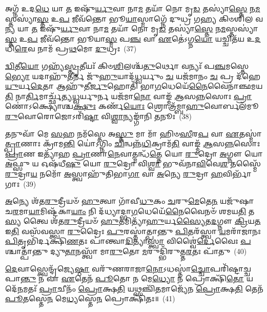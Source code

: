 {\anuvakamend[{\-\ul{𑌶𑍍𑌯𑍈}\-\-\ul{𑌤}\-𑌤𑍍𑌵𑌂 \ul{𑌪𑍍𑌰}\-𑌤𑍀𑌚𑍍𑌯𑌾॑ 𑌤𑍍𑌵𑌾 \ul{𑌦𑌿}\-𑌶𑌾 𑌸𑌾᳴𑌦𑌯𑌾\-\ul{𑌮𑌿} 𑌯𑌃 𑌸𑌾𑌤𑍍𑌮𑌾᳴𑌨𑌞𑍍𑌚𑌿\-\ul{𑌨𑍁}\-𑌤𑍇 𑌦𑍍𑌵𑌾𑌵𑌿𑍞᳴𑌶𑌤𑌿𑌶𑍍𑌚}]}%

𑌅𑌗𑍍𑌨᳴ 𑌉𑌦\-\ul{𑌧𑍇} 𑌯𑌾 \ul{𑌤} 𑌇𑌷𑍁᳴\-\ul{𑌰𑍍𑌯𑍁}\-𑌵𑌾 𑌨𑌾\-\ul{𑌮} 𑌤𑌯𑌾᳴ 𑌨𑍋 𑌮𑍃\-\ul{𑌡} 𑌤𑌸𑍍𑌯𑌾॑\-\ul{𑌸𑍍𑌤𑍇} 𑌨\-\ul{𑌮}\-𑌸𑍍𑌤𑌸𑍍𑌯𑌾॑\-\ul{𑌸𑍍𑌤} 𑌉\-\ul{𑌪} 𑌜𑍀𑌵᳴𑌨𑍍𑌤𑍋 𑌭𑍂\-\ul{𑌯𑌾}\-𑌸𑍍𑌮𑌾𑌗𑍍𑌨𑍇᳴ 𑌦𑍁𑌧𑍍𑌰 𑌗𑌹𑍍𑌯 𑌕𑌿𑍞𑌶𑌿𑌲 𑌵\-\ul{𑌨𑍍𑌯} 𑌯𑌾 \ul{𑌤} 𑌇𑌷𑍁᳴\-\ul{𑌰𑍍𑌯𑍁}\-𑌵𑌾 𑌨𑌾\-\ul{𑌮} 𑌤𑌯𑌾᳴ 𑌨𑍋 𑌮𑍃\-\ul{𑌡} 𑌤𑌸𑍍𑌯𑌾॑\-\ul{𑌸𑍍𑌤𑍇} 𑌨\-\ul{𑌮}\-𑌸𑍍𑌤𑌸𑍍𑌯𑌾॑\-\ul{𑌸𑍍𑌤} 𑌉\-\ul{𑌪} 𑌜𑍀𑌵᳴𑌨𑍍𑌤𑍋 𑌭𑍂𑌯𑌾\-\ul{𑌸𑍍𑌮} 𑌪\-\ul{𑌞𑍍𑌚} 𑌵𑌾 \ul{𑌏}\-𑌤𑍇॑\-𑌽𑌗𑍍𑌨\-\ul{𑌯𑍋} 𑌯𑌚𑍍𑌚𑌿𑌤᳴𑌯 𑌉\-\ul{𑌦}\-𑌧𑌿\-\ul{𑌰𑍇}\-𑌵 𑌨𑌾𑌮᳴ 𑌪𑍍𑌰\-\ul{𑌥}\-𑌮𑍋 \ul{𑌦𑍁}\-𑌧𑍍𑌰𑌃~(37)

\-\ul{𑌦𑍍𑌵𑌿}\-𑌤𑍀\-\ul{𑌯𑍋} 𑌗𑌹𑍍𑌯᳴\-\ul{𑌸𑍍𑌤𑍃}\-𑌤𑍀𑌯𑌃᳴ 𑌕𑌿𑍞\-\ul{𑌶𑌿}\-𑌲𑌶𑍍𑌚᳴\-\ul{𑌤𑍁}\-𑌰𑍍𑌥𑍋 𑌵𑌨𑍍𑌯𑌃᳴ 𑌪\-\ul{𑌞𑍍𑌚}\-𑌮𑌸𑍍𑌤𑍇\-\ul{𑌭𑍍𑌯𑍋} 𑌯𑌦𑌾𑌹𑍁᳴\-\ul{𑌤𑍀}\-𑌰𑍍𑌨 𑌜𑍁᳴\-\ul{𑌹𑍁}\-𑌯𑌾𑌦᳴\-\ul{𑌧𑍍𑌵}\-𑌰𑍍𑌯𑍁𑌂 \ul{𑌚} 𑌯𑌜᳴𑌮𑌾𑌨𑌂 \ul{𑌚} 𑌪𑍍𑌰 𑌦᳴𑌹𑍇\-\ul{𑌯𑍁}\-𑌰𑍍𑌯\-\ul{𑌦𑍇}\-𑌤𑌾 𑌆𑌹𑍁᳴𑌤𑍀\-\ul{𑌰𑍍𑌜𑍁}\-𑌹𑍋𑌤𑌿᳴ 𑌭𑌾\-\ul{𑌗}\-𑌧𑍇𑌯𑍇᳴\-\ul{𑌨𑍈}\-𑌵𑍈𑌨𑌾॑𑌞𑍍𑌛𑌮𑌯\-\ul{𑌤𑌿} 𑌨𑌾\-\ul{𑌰𑍍𑌤𑌿}\-𑌮𑌾𑌰𑍍𑌚𑍍𑌛᳴𑌤𑍍𑌯\-\ul{𑌧𑍍𑌵}\-𑌰𑍍𑌯𑍁𑌰𑍍𑌨 𑌯𑌜᳴𑌮𑌾\-\ul{𑌨𑍋} 𑌵𑌾𑌙𑍍𑌮᳴ \ul{𑌆}\-𑌸\-\ul{𑌨𑍍𑌨}\-𑌸𑍋𑌃 \ul{𑌪𑍍𑌰𑌾}\-𑌣𑍋॑\-𑌽𑌕𑍍𑌷𑍍𑌯𑍋𑌶𑍍𑌚\-\ul{𑌕𑍍𑌷𑍁𑌃} 𑌕𑌰𑍍𑌣᳴\-\ul{𑌯𑍋𑌃} 𑌶𑍍𑌰𑍋𑌤𑍍𑌰᳴𑌮𑍍𑌬𑌾\-\ul{𑌹𑍁}\-𑌵𑍋𑌰𑍍𑌬𑌲᳴𑌮𑍂\-\ul{𑌰𑍁}\-𑌵𑍋𑌰𑍋𑌜𑍋\-𑌽𑌰𑌿᳴\-\ul{𑌷𑍍𑌟𑌾} 𑌵𑌿\-\ul{𑌶𑍍𑌵𑌾}\-𑌨𑍍𑌯𑌙𑍍𑌗𑌾᳴𑌨𑌿 \ul{𑌤}\-𑌨𑍂𑌃~(38)

\-\ul{𑌤}\-𑌨𑍁𑌵𑌾᳴ 𑌮𑍇 \ul{𑌸}\-𑌹 𑌨𑌮᳴𑌸𑍍𑌤𑍇 𑌅\-\ul{𑌸𑍍𑌤𑍁} 𑌮𑌾 𑌮𑌾᳴ 𑌹𑌿𑍞\-\ul{𑌸𑍀}\-𑌰\-\ul{𑌪} 𑌵𑌾 \ul{𑌏}\-𑌤𑌸𑍍𑌮𑌾॑\-\ul{𑌤𑍍𑌪𑍍𑌰𑌾}\-𑌣𑌾𑌃 𑌕𑍍𑌰𑌾᳴𑌮\-\ul{𑌨𑍍𑌤𑌿} 𑌯𑍋॑\-𑌽𑌗𑍍𑌨𑌿𑌂 \ul{𑌚𑌿}\-𑌨𑍍𑌵𑌨𑍍𑌨᳴\-\ul{𑌧𑌿}\-𑌕𑍍𑌰𑌾𑌮᳴\-\ul{𑌤𑌿} 𑌵𑌾𑌙𑍍𑌮᳴ \ul{𑌆}\-𑌸\-\ul{𑌨𑍍𑌨}\-𑌸𑍋𑌃 \ul{𑌪𑍍𑌰𑌾}\-𑌣 𑌇𑌤𑍍𑌯𑌾᳴𑌹 \ul{𑌪𑍍𑌰𑌾}\-𑌣𑌾\-\ul{𑌨𑍇}\-𑌵𑌾𑌤𑍍𑌮𑌨𑍍𑌧᳴\-\ul{𑌤𑍍𑌤𑍇} 𑌯𑍋 \ul{𑌰𑍁}\-𑌦𑍍𑌰𑍋 \ul{𑌅}\-𑌗𑍍𑌨𑍗 𑌯𑍋 \ul{𑌅}\-𑌫𑍍𑌸𑍁 𑌯 𑌓𑌷᳴𑌧𑍀\-\ul{𑌷𑍁} 𑌯𑍋 \ul{𑌰𑍁}\-𑌦𑍍𑌰𑍋 𑌵𑌿\-\ul{𑌶𑍍𑌵𑌾} 𑌭𑍁𑌵᳴𑌨𑌾\-\ul{𑌵𑌿}\-𑌵𑍇\-\ul{𑌶} 𑌤𑌸𑍍𑌮𑍈᳴ \ul{𑌰𑍁}\-𑌦𑍍𑌰𑌾\-\ul{𑌯} 𑌨𑌮𑍋᳴ \ul{𑌅}\-𑌸𑍍𑌤𑍍𑌵𑌾𑌹𑍁᳴𑌤𑌿𑌭𑌾\-\ul{𑌗𑌾} 𑌵𑌾 \ul{𑌅}\-𑌨𑍍𑌯𑍇 \ul{𑌰𑍁}\-𑌦𑍍𑌰𑌾 \ul{𑌹}\-𑌵𑌿𑌰𑍍𑌭𑌾᳴𑌗𑌾𑌃~(39)

\-\ul{𑌅}\-𑌨𑍍𑌯𑍇 𑌶᳴𑌤\-\ul{𑌰𑍁}\-𑌦𑍍𑌰𑍀𑌯𑍞᳴ \ul{𑌹𑍁}\-𑌤𑍍𑌵𑌾 𑌗𑌾᳴𑌵𑍀\-\ul{𑌧𑍁}\-𑌕𑌂 \ul{𑌚}\-𑌰𑍁\-\ul{𑌮𑍇}\-𑌤𑍇\-\ul{𑌨} 𑌯𑌜𑍁᳴𑌷𑌾 𑌚\-\ul{𑌰}\-𑌮𑌾\-\ul{𑌯𑌾}\-𑌮𑌿𑌷𑍍𑌟᳴𑌕𑌾\-\ul{𑌯𑌾𑌂} 𑌨𑌿 𑌦᳴𑌧𑍍𑌯𑌾𑌦𑍍𑌭𑌾\-\ul{𑌗}\-𑌧𑍇𑌯𑍇᳴\-\ul{𑌨𑍈}\-𑌵𑍈𑌨𑍞᳴ 𑌶𑌮𑌯\-\ul{𑌤𑌿} 𑌤\-\ul{𑌸𑍍𑌯} 𑌤𑍍𑌵𑍈 𑌶᳴𑌤\-\ul{𑌰𑍁}\-𑌦𑍍𑌰𑍀𑌯𑍞᳴ \ul{𑌹𑍁}\-𑌤𑌮𑌿𑌤𑍍𑌯𑌾᳴\-\ul{𑌹𑍁}\-𑌰𑍍𑌯\-\ul{𑌸𑍍𑌯𑍈}\-𑌤\-\ul{𑌦}\-𑌗𑍍𑌨𑍗 \ul{𑌕𑍍𑌰𑌿}\-𑌯\-\ul{𑌤} 𑌇\-\ul{𑌤𑌿} 𑌵𑌸᳴𑌵𑌸𑍍𑌤𑍍𑌵𑌾 \ul{𑌰𑍁}\-𑌦𑍍𑌰𑍈𑌃 \ul{𑌪𑍁}\-𑌰𑌸𑍍𑌤𑌾॑𑌤𑍍𑌪𑌾𑌨𑍍𑌤𑍁 \ul{𑌪𑌿}\-𑌤𑌰᳴𑌸𑍍𑌤𑍍𑌵𑌾 \ul{𑌯}\-𑌮𑌰𑌾᳴𑌜𑌾𑌨𑌃 \ul{𑌪𑌿}\-𑌤𑍃𑌭𑌿᳴𑌰𑍍𑌦𑌕𑍍𑌷𑌿\-\ul{𑌣}\-𑌤𑌃 𑌪𑌾॑𑌨𑍍𑌤𑍍𑌵𑌾\-\ul{𑌦𑌿}\-𑌤𑍍𑌯𑌾\-\ul{𑌸𑍍𑌤𑍍𑌵𑌾} 𑌵𑌿𑌶𑍍𑌵𑍈॑\-\ul{𑌰𑍍𑌦𑍇}\-𑌵𑍈𑌃 \ul{𑌪}\-𑌶𑍍𑌚𑌾𑌤𑍍𑌪𑌾॑𑌨𑍍𑌤𑍁 𑌦𑍍𑌯𑍁\-\ul{𑌤𑌾}\-𑌨𑌸𑍍𑌤𑍍𑌵𑌾᳴ 𑌮𑌾\-\ul{𑌰𑍁}\-𑌤𑍋 \ul{𑌮}\-𑌰𑍁𑌦𑍍𑌭𑌿᳴𑌰𑍁𑌤𑍍𑌤\-\ul{𑌰}\-𑌤𑌃 𑌪𑌾᳴𑌤𑍁~(40)

\-\ul{𑌦𑍇}\-𑌵𑌾𑌸𑍍𑌤𑍍𑌵𑍇𑌨𑍍𑌦𑍍𑌰᳴𑌜𑍍𑌯𑍇\-\ul{𑌷𑍍𑌠𑌾} 𑌵𑌰𑍁᳴𑌣𑌰𑌾𑌜𑌾\-\ul{𑌨𑍋}\-\-𑌽𑌧𑌸𑍍𑌤𑌾॑\-\ul{𑌚𑍍𑌚𑍋}\-𑌪𑌰𑌿᳴𑌷𑍍𑌟𑌾𑌚𑍍𑌚 𑌪𑌾\-\ul{𑌨𑍍𑌤𑍁} 𑌨 𑌵𑌾 \ul{𑌏}\-𑌤𑍇𑌨᳴ \ul{𑌪𑍂}\-𑌤𑍋 𑌨 𑌮𑍇\-\ul{𑌧𑍍𑌯𑍋} 𑌨 𑌪𑍍𑌰𑍋𑌕𑍍𑌷𑌿᳴\-\ul{𑌤𑍋} 𑌯𑌦𑍇᳴\-\ul{𑌨}\-𑌮𑌤𑌃᳴ \ul{𑌪𑍍𑌰𑌾}\-𑌚𑍀𑌨𑌂᳴ \ul{𑌪𑍍𑌰𑍋}\-𑌕𑍍𑌷\-\ul{𑌤𑌿} 𑌯𑌥𑍍𑌸𑌞𑍍𑌚𑌿᳴\-\ul{𑌤}\-𑌮𑌾𑌜𑍍𑌯𑍇᳴𑌨 \ul{𑌪𑍍𑌰𑍋}\-𑌕𑍍𑌷\-\ul{𑌤𑌿} 𑌤𑍇𑌨᳴ \ul{𑌪𑍂}\-𑌤𑌸𑍍𑌤𑍇\-\ul{𑌨} 𑌮𑍇\-\ul{𑌧𑍍𑌯}\-𑌸𑍍𑌤𑍇\-\ul{𑌨} 𑌪𑍍𑌰𑍋𑌕𑍍𑌷𑌿᳴𑌤𑌃॥~(41)

